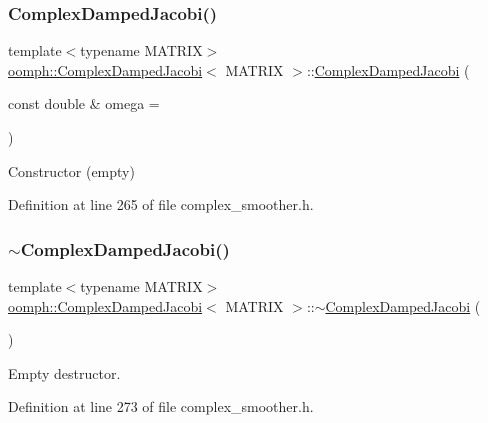 \subsubsection{\texorpdfstring{Complex\+Damped\+Jacobi()}{ComplexDampedJacobi()}\hspace{0.1cm}{\footnotesize\ttfamily [1/2]}}
{\footnotesize\ttfamily template$<$typename M\+A\+T\+R\+IX$>$ \\
\hyperlink{classoomph_1_1ComplexDampedJacobi}{oomph\+::\+Complex\+Damped\+Jacobi}$<$ M\+A\+T\+R\+IX $>$\+::\hyperlink{classoomph_1_1ComplexDampedJacobi}{Complex\+Damped\+Jacobi} (\begin{DoxyParamCaption}\item[{const double \&}]{omega = {} }\end{DoxyParamCaption})\hspace{0.3cm}{\ttfamily [inline]}}



Constructor (empty) 



Definition at line 265 of file complex\+\_\+smoother.\+h.

\mbox{\label{classoomph_1_1ComplexDampedJacobi_a102defdc208413f82a6cd377bf5e0517}} 
\subsubsection{\texorpdfstring{$\sim$\+Complex\+Damped\+Jacobi()}{~ComplexDampedJacobi()}}
{\footnotesize\ttfamily template$<$typename M\+A\+T\+R\+IX$>$ \\
\hyperlink{classoomph_1_1ComplexDampedJacobi}{oomph\+::\+Complex\+Damped\+Jacobi}$<$ M\+A\+T\+R\+IX $>$\+::$\sim$\hyperlink{classoomph_1_1ComplexDampedJacobi}{Complex\+Damped\+Jacobi} (\begin{DoxyParamCaption}{ }\end{DoxyParamCaption})\hspace{0.3cm}{\ttfamily [inline]}}



Empty destructor. 



Definition at line 273 of file complex\+\_\+smoother.\+h.



